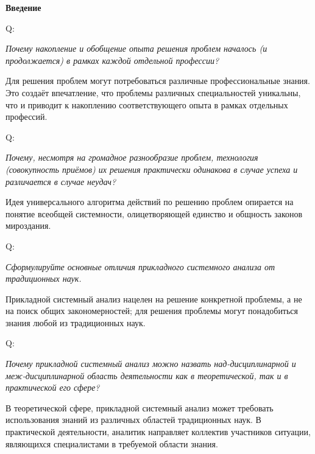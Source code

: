 \documentclass{article}
\renewcommand{\subsection}[1]{
	\vspace{2em}
	\begin{flushright}
		\large
		\textbf{#1}
	\end{flushright}
	}
\newcommand{\question}[2]{
	\begin{flushright}
		Q:\hspace{2ex}\vline\hspace{2ex}
		\begin{minipage}{0.9\textwidth}
			\large
			\textit{#1}
		\end{minipage}
	\end{flushright}
	\begin{center}
		\begin{minipage}{0.95\textwidth}
			#2
		\end{minipage}
	\end{center}
	}
\begin{document}
\subsection{Введение}
\question{Почему накопление и обобщение опыта решения проблем началось (и продолжается) в рамках каждой отдельной профессии?}{Для решения проблем могут потребоваться различные профессиональные знания. Это создаёт впечатление, что проблемы различных специальностей уникальны, что и приводит к накоплению соответствующего опыта в рамках отдельных профессий.}
\question{Почему, несмотря на громадное разнообразие проблем, технология (совокупность приёмов) их решения практически одинакова в случае успеха и различается в случае неудач?}{Идея универсального алгоритма действий по решению проблем опирается на понятие всеобщей системности, олицетворяющей единство и общность законов мироздания.}
\question{Сформулируйте основные отличия прикладного системного анализа от традиционных наук.}{Прикладной системный анализ нацелен на решение конкретной проблемы, а не на поиск общих закономерностей; для решения проблемы могут понадобиться знания любой из традиционных наук.}
\question{Почему прикладной системный анализ можно назвать над-дисциплинарной и меж-дисциплинарной область деятельности как в теоретической, так и в практической его сфере?}{В теоретической сфере, прикладной системный анализ может требовать использования знаний из различных областей традиционных наук. В практической деятельности, аналитик направляет коллектив участников ситуации, являющихся специалистами в требуемой области знания.}
\end{document}
